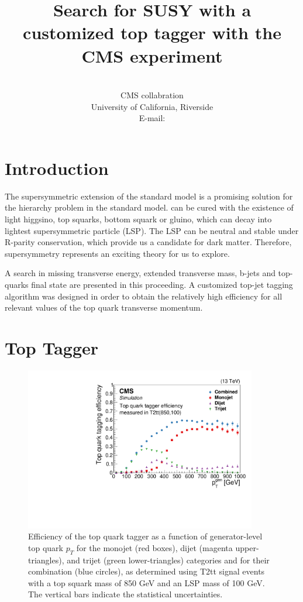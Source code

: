 \documentclass{PoS}
\title{Search for SUSY with a customized top tagger with the CMS experiment}
\author
{
  \speaker{Hua Wei}\\
  CMS collabration\\
  University of California, Riverside\\
  E-mail: \email{hua.wei@cern.ch}
}
\begin{document}
\section{Introduction}

The supersymmetric extension of the standard model is a promising solution for the hierarchy problem in the standard model. can be cured with the existence of light higgsino, top squarks, bottom squark or gluino, which can decay into lightest supersymmetric particle (LSP). The LSP can be neutral and stable under R-parity conservation, which provide us a candidate for dark matter. Therefore, supersymmetry represents an exciting theory for us to explore.

A search in missing transverse energy, extended transverse mass, b-jets and top-quarks final state are presented in this proceeding. A customized top-jet tagging algorithm was designed in order to obtain the relatively high efficiency for all relevant values of the top quark transverse momentum.

\section{Top Tagger}

\begin{figure}[htbp]
 \begin{center}
  \includegraphics[width=0.90\textwidth]{figures/Tagger_Paper.pdf}
 \end{center}
 \caption{Efficiency of the top quark tagger as a function of generator-level top quark $p_{T}$ for
the monojet (red boxes), dijet (magenta upper-triangles), and trijet (green lower-triangles) categories
and for their combination (blue circles), as determined using T2tt signal events with a
top squark mass of 850 GeV and an LSP mass of 100 GeV. The vertical bars indicate the statistical
uncertainties.}
 \label{fig:c4ttefftight}
\end{figure}
\end{document}
